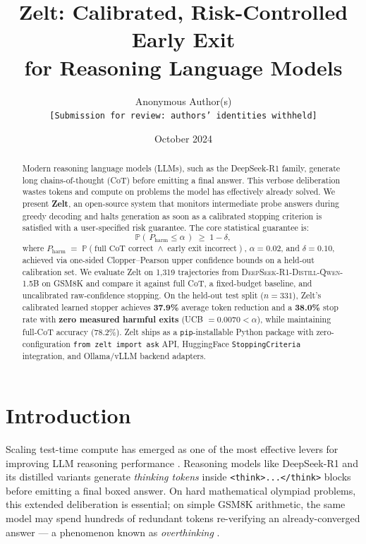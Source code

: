 \documentclass[11pt]{article}
\title{\textbf{Zelt: Calibrated, Risk-Controlled Early Exit\\
               for Reasoning Language Models}}
\author{
  Anonymous Author(s)\\
  \texttt{[Submission for review: authors' identities withheld]}
}
\date{October 2024}
\begin{document}
\maketitle

\begin{abstract}
Modern reasoning language models (LLMs), such as the DeepSeek-R1 family,
generate long chains-of-thought (CoT) before emitting a final answer.
This verbose deliberation wastes tokens and compute on problems
the model has effectively already solved.
We present \textbf{Zelt}, an open-source system that monitors
intermediate probe answers during greedy decoding and halts
generation as soon as a calibrated stopping criterion is satisfied
with a user-specified risk guarantee.
The core statistical guarantee is:
\[
  \mathbb{P}\!\left(\,P_{\mathrm{harm}} \le \alpha\,\right) \;\ge\; 1 - \delta,
\]
where $P_{\mathrm{harm}} \;=\; \mathbb{P}(\text{full CoT correct} \;\wedge\; \text{early exit incorrect})$,
$\alpha = 0.02$, and $\delta = 0.10$, achieved via one-sided
Clopper--Pearson upper confidence bounds on a held-out calibration set.
We evaluate Zelt on 1{,}319 trajectories from
\textsc{DeepSeek-R1-Distill-Qwen-1.5B} on GSM8K and compare
it against full CoT, a fixed-budget baseline, and
uncalibrated raw-confidence stopping.
On the held-out test split ($n=331$), Zelt's calibrated learned
stopper achieves \textbf{37.9\%} average token reduction and a
\textbf{38.0\%} stop rate with \textbf{zero measured harmful exits}
(UCB $= 0.0070 < \alpha$), while maintaining full-CoT accuracy
($78.2\%$).
Zelt ships as a \texttt{pip}-installable Python package
with zero-configuration \texttt{from zelt import ask} API,
HuggingFace \texttt{StoppingCriteria} integration, and
Ollama/vLLM backend adapters.
\end{abstract}

\section{Introduction}
\label{sec:intro}

Scaling test-time compute has emerged as one of the most effective
levers for improving LLM reasoning performance
\citep{snell2024scalingllmtesttime,openai2024o1}.
Reasoning models like DeepSeek-R1 \citep{deepseek2025r1} and its
distilled variants generate \emph{thinking tokens} inside
\texttt{<think>...</think>} blocks before emitting a final boxed answer.
On hard mathematical olympiad problems, this extended deliberation is
essential; on simple GSM8K arithmetic, the same model may spend
hundreds of redundant tokens re-verifying an already-converged answer
--- a phenomenon known as \emph{overthinking}
\citep{chen2024think,fan2025overthinking}.
\end{document}
